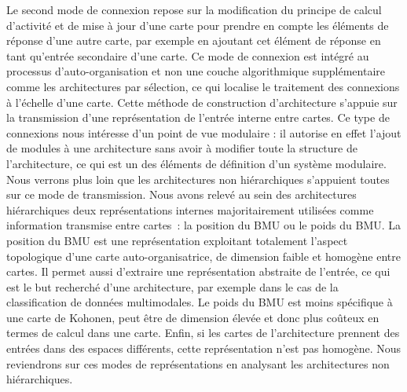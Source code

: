 \documentclass[../main]{subfiles}
\begin{document}
Le second mode de connexion repose sur la modification du principe de calcul d'activité et de mise à jour d'une carte pour prendre en compte les éléments de réponse d'une autre carte, par exemple en ajoutant cet élément de réponse en tant qu'entrée secondaire d'une carte.
Ce mode de connexion est intégré au processus d'auto-organisation et non une couche algorithmique supplémentaire comme les architectures par sélection, ce qui localise le traitement des connexions à l'échelle d'une carte. 
Cette méthode de construction d'architecture s'appuie sur la transmission d'une représentation de l'entrée interne entre cartes.
Ce type de connexions nous intéresse d'un point de vue modulaire : il autorise en effet l'ajout de modules à une architecture sans avoir à modifier toute la structure de l'architecture, ce qui est un des éléments de définition d'un système modulaire.
Nous verrons plus loin que les architectures non hiérarchiques s'appuient toutes sur ce mode de transmission.
Nous avons relevé au sein des architectures hiérarchiques deux représentations internes majoritairement utilisées comme information transmise entre cartes~: la position du BMU ou le poids du BMU. La position du BMU est une représentation exploitant totalement l'aspect topologique d'une carte auto-organisatrice, de dimension faible et homogène entre cartes. Il permet aussi d'extraire une représentation abstraite de l'entrée, ce qui est le but recherché d'une architecture, par exemple dans le cas de la classification de données multimodales.
Le poids du BMU est moins spécifique à une carte de Kohonen, peut être de dimension élevée et donc plus coûteux en termes de calcul dans une carte. Enfin, si les cartes de l'architecture prennent des entrées dans des espaces différents, cette représentation n'est pas homogène. 
Nous reviendrons sur ces modes de représentations en analysant les architectures non hiérarchiques.
\end{document}
